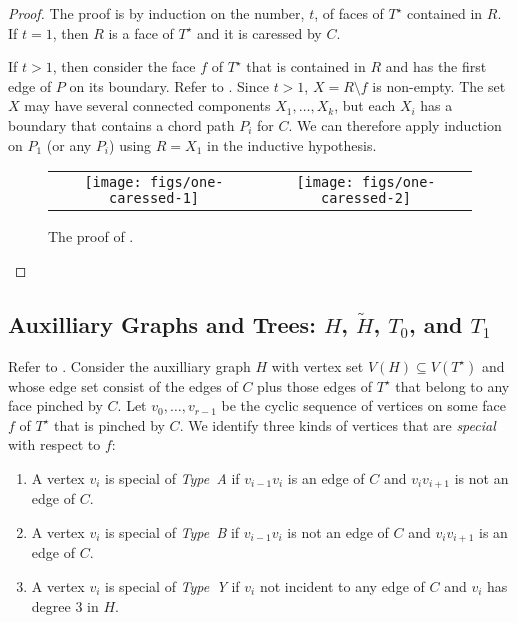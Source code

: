 \documentclass{patmorin}
\newcommand{\dual}[1]{{#1}^\star}
\begin{document}
\begin{proof}
   The proof is by
   induction on the number, $t$, of faces of $\dual{T}$ contained in $R$.
   If $t=1$, then $R$ is a face of $\dual{T}$ and it is caressed by $C$.

   If $t>1$, then consider the face $f$ of $\dual{T}$ that is contained
   in $R$ and has the first edge of $P$ on its boundary.  Refer to
   . Since $t>1$, $X=R\setminus f$ is non-empty. The
   set $X$ may have several connected components $X_1,\ldots,X_k$, but
   each $X_i$ has a boundary that contains a chord path $P_i$ for $C$.
   We can therefore apply induction on $P_1$ (or any $P_i$) using $R=X_1$
   in the inductive hypothesis.
  \begin{figure}
     \begin{center}
	\begin{tabular}{cc}
		\texttt{[image: figs/one-caressed-1]} &
		\texttt{[image: figs/one-caressed-2]}
	\end{tabular}
     \end{center}
	  \caption{The proof of .}
  \end{figure}
\end{proof}

\subsection{Auxilliary Graphs and Trees: $H$, $\tilde{H}$, $T_0$, and $T_1$}

Refer to . Consider the auxilliary
graph $H$ with vertex set $V(H)\subseteq V(\dual{T})$ and whose edge set
consist of the edges of $C$ plus those edges of $\dual{T}$ that belong
to any face pinched by $C$. Let $v_0,\ldots,v_{r-1}$ be the cyclic sequence of vertices on some face $f$ of $\dual{T}$ that is pinched by $C$.  
We identify three kinds of vertices that are \emph{special} with respect to $f$:
\begin{enumerate}
  \item A vertex $v_i$ is special of \emph{Type~A} if $v_{i-1}v_i$ is an edge of $C$ and $v_iv_{i+1}$ is not an edge of $C$.
  \item A vertex $v_i$ is special of \emph{Type~B} if $v_{i-1}v_i$ is not an edge of $C$ and $v_iv_{i+1}$ is an edge of $C$.
  \item A vertex $v_i$ is special of \emph{Type~Y} if $v_i$ not incident to any edge of $C$ and $v_i$ has degree 3 in $H$.
\end{enumerate}
\end{document}
